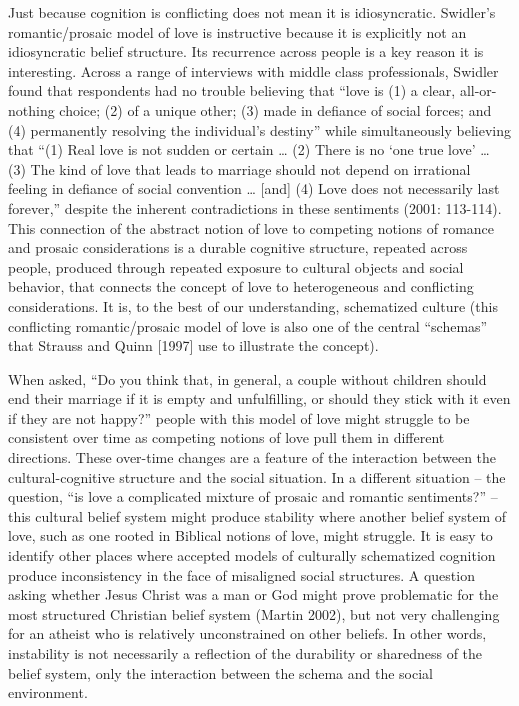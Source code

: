 \documentclass[12pt,]{article}
\begin{document}
Just because cognition is conflicting does not mean it is idiosyncratic. Swidler's romantic/prosaic model of love is instructive because it is explicitly not an idiosyncratic belief structure. Its recurrence across people is a key reason it is interesting. Across a range of interviews with middle class professionals, Swidler found that respondents had no trouble believing that ``love is (1) a clear, all-or-nothing choice; (2) of a unique other; (3) made in defiance of social forces; and (4) permanently resolving the individual's destiny'' while simultaneously believing that ``(1) Real love is not sudden or certain \ldots{} (2) There is no `one true love' \ldots{} (3) The kind of love that leads to marriage should not depend on irrational feeling in defiance of social convention \ldots{} {[}and{]} (4) Love does not necessarily last forever,'' despite the inherent contradictions in these sentiments (2001: 113-114). This connection of the abstract notion of love to competing notions of romance and prosaic considerations is a durable cognitive structure, repeated across people, produced through repeated exposure to cultural objects and social behavior, that connects the concept of love to heterogeneous and conflicting considerations. It is, to the best of our understanding, schematized culture (this conflicting romantic/prosaic model of love is also one of the central ``schemas'' that Strauss and Quinn {[}1997{]} use to illustrate the concept).

When asked, ``Do you think that, in general, a couple without children should end their marriage if it is empty and unfulfilling, or should they stick with it even if they are not happy?'' people with this model of love might struggle to be consistent over time as competing notions of love pull them in different directions. These over-time changes are a feature of the interaction between the cultural-cognitive structure and the social situation. In a different situation -- the question, ``is love a complicated mixture of prosaic and romantic sentiments?'' -- this cultural belief system might produce stability where another belief system of love, such as one rooted in Biblical notions of love, might struggle. It is easy to identify other places where accepted models of culturally schematized cognition produce inconsistency in the face of misaligned social structures. A question asking whether Jesus Christ was a man or God might prove problematic for the most structured Christian belief system (Martin 2002), but not very challenging for an atheist who is relatively unconstrained on other beliefs. In other words, instability is not necessarily a reflection of the durability or sharedness of the belief system, only the interaction between the schema and the social environment.
\end{document}
